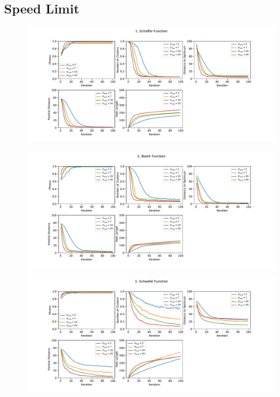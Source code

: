 \documentclass[12pt]{article}
\begin{document}
\subsection{Speed Limit}
\begin{figure}
	\centering
	\includegraphics[width=1\textwidth]{figures/ex5/ex5-1.pdf}
	\label{fig:ex5-1}
\end{figure}
\begin{figure}
	\centering
	\includegraphics[width=1\textwidth]{figures/ex5/ex5-2.pdf}
	\label{fig:ex5-2}
\end{figure}
\begin{figure}
	\centering
	\includegraphics[width=1\textwidth]{figures/ex5/ex5-3.pdf}
	\label{fig:ex5-3}
\end{figure}
\end{document}
